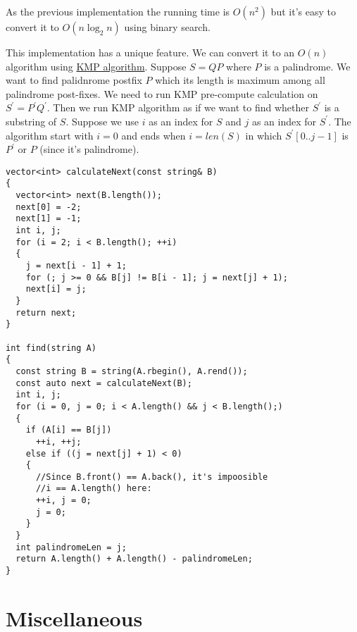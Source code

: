 \documentclass{book}
\begin{document}
	As the previous implementation the running time is $O(n^2)$ but it's easy to convert it to $O(n\log_2n)$ using binary search.
	\par This implementation has a unique feature. We can convert it to an $O(n)$ algorithm using \href{https://en.wikipedia.org/wiki/Knuth%E2%80%93Morris%E2%80%93Pratt_algorithm}{KMP algorithm}. Suppose $S=QP$ where $P$ is a palindrome. We want to find palidnrome postfix $P$ which its length is maximum among all palindrome post-fixes. We need to run KMP pre-compute calculation on $S^\prime = P^\prime Q^\prime$. Then we run KMP algorithm as if we want to find whether $S^\prime$ is a substring of $S$. Suppose we use $i$ as an index for $S$ and $j$ as an index for $S^\prime$. The algorithm start with $i = 0$ and ends when $i = len(S)$ in which $S^\prime[0..j - 1]$ is $P^\prime$ or $P$ (since it's palindrome).
	
	\begin{lstlisting}
vector<int> calculateNext(const string& B)
{
  vector<int> next(B.length());
  next[0] = -2;
  next[1] = -1;
  int i, j;
  for (i = 2; i < B.length(); ++i)
  {
    j = next[i - 1] + 1;
    for (; j >= 0 && B[j] != B[i - 1]; j = next[j] + 1);
    next[i] = j;
  }
  return next;
}

int find(string A)
{
  const string B = string(A.rbegin(), A.rend());
  const auto next = calculateNext(B);
  int i, j;
  for (i = 0, j = 0; i < A.length() && j < B.length();)
  {
    if (A[i] == B[j])
      ++i, ++j;
    else if ((j = next[j] + 1) < 0)
    {
      //Since B.front() == A.back(), it's impoosible
      //i == A.length() here:
      ++i, j = 0;
      j = 0;
    }
  }
  int palindromeLen = j;
  return A.length() + A.length() - palindromeLen; 
}	
	\end{lstlisting}
	\chapter{Miscellaneous}	
\end{document}
